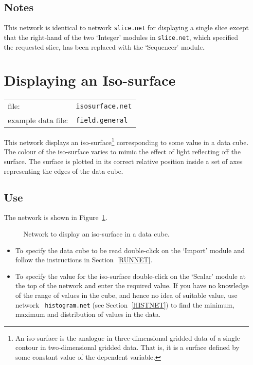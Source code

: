\documentclass[twoside,11pt]{article}
\newcommand{\xlabel}[1]{}
\begin{document}
\subsection{Notes}

This network is identical to network {\tt slice.net} for displaying
a single slice except that the right-hand of the two `Integer' modules
in {\tt slice.net}, which specified the requested slice, has been
replaced with the `Sequencer' module.


\newpage
\section{\xlabel{ISOSURFNET}Displaying an Iso-surface}


\begin{tabular}{ll}
file:              & {\tt isosurface.net} \\
example data file: & {\tt field.general}  \\
\end{tabular}

This network displays an iso-surface\footnote{An iso-surface is the
analogue in three-dimensional gridded data of a single contour in
two-dimensional gridded data. That is, it is a surface defined by some
constant value of the dependent variable.} corresponding to some value in
a data cube. The colour of the iso-surface varies to mimic the effect
of light reflecting off the surface. The surface is plotted in its
correct relative position inside a set of axes representing the edges
of the data cube.

\subsection{Use}

The network is shown in Figure~\ref{ISOSURFNETF}.

\begin{figure}[htbp]

\begin{center}
\leavevmode
\epsfxsize=271pt
\end{center}

\caption[Network to display an iso-surface in a data cube.]{Network to
display an iso-surface in a data cube. \label{ISOSURFNETF} }

\end{figure}

\begin{itemize}

  \item To specify the data cube to be read double-click on the `Import'
   module and follow the instructions in Section~\ref{RUNNET}.

  \item To specify the value for the iso-surface double-click on the
   `Scalar' module at the top of the network and enter the required
   value.  If you have no knowledge of the range of values in the
   cube, and hence no idea of suitable value, use network {\tt
   histogram.net} (see Section~\ref{HISTNET}) to find the minimum,
   maximum and distribution of values in the data.

\end{itemize}
\end{document}
